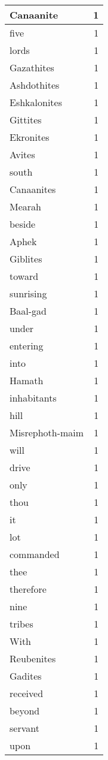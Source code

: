 \begin{center}
\begin{longtable}{l|r}
Canaanite & 1\\ \hline 
five & 1\\ \hline 
lords & 1\\ \hline 
Gazathites & 1\\ \hline 
Ashdothites & 1\\ \hline 
Eshkalonites & 1\\ \hline 
Gittites & 1\\ \hline 
Ekronites & 1\\ \hline 
Avites & 1\\ \hline 
south & 1\\ \hline 
Canaanites & 1\\ \hline 
Mearah & 1\\ \hline 
beside & 1\\ \hline 
Aphek & 1\\ \hline 
Giblites & 1\\ \hline 
toward & 1\\ \hline 
sunrising & 1\\ \hline 
Baal-gad & 1\\ \hline 
under & 1\\ \hline 
entering & 1\\ \hline 
into & 1\\ \hline 
Hamath & 1\\ \hline 
inhabitants & 1\\ \hline 
hill & 1\\ \hline 
Misrephoth-maim & 1\\ \hline 
will & 1\\ \hline 
drive & 1\\ \hline 
only & 1\\ \hline 
thou & 1\\ \hline 
it & 1\\ \hline 
lot & 1\\ \hline 
commanded & 1\\ \hline 
thee & 1\\ \hline 
therefore & 1\\ \hline 
nine & 1\\ \hline 
tribes & 1\\ \hline 
With & 1\\ \hline 
Reubenites & 1\\ \hline 
Gadites & 1\\ \hline 
received & 1\\ \hline 
beyond & 1\\ \hline 
servant & 1\\ \hline 
upon & 1\\ \hline 

\end{longtable}
\end{center}

